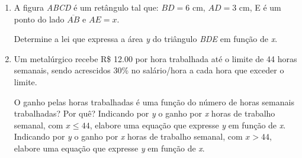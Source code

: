 \begin{enumerate}[label*=\protect\fbox{\arabic{enumi}}]
  \item A figura \textit{ABCD} é um retângulo tal que: $BD = 6$ cm, $AD = 3$ cm, E é um ponto do lado $\overline{AB}$ e $AE = x$.

    \begin{center}

    \end{center}
    
    Determine a lei que expressa a área \textit{y} do triângulo \textit{BDE} em função de \textit{x}.

  \item Um metalúrgico recebe R\$ 12.00 por hora trabalhada até o limite de 44 horas semanais, sendo acrescidos 30\% no salário/hora a cada 
    hora que exceder o limite. 

    \begin{tasks}
      \task O ganho pelas horas trabalhadas é uma função do número de horas semanais trabalhadas? Por quê?
      \task Indicando por \textit{y} o ganho por \textit{x} horas de trabalho semanal, com $x \leq 44$, elabore uma equação que expresse \textit{y} em 
      função de \textit{x}.
      \task Indicando por \textit{y} o ganho por \textit{x} horas de trabalho semanal, com $x > 44$, elabore uma equação que expresse \textit{y} em função de \textit{x}.
    \end{tasks}


\end{enumerate}
